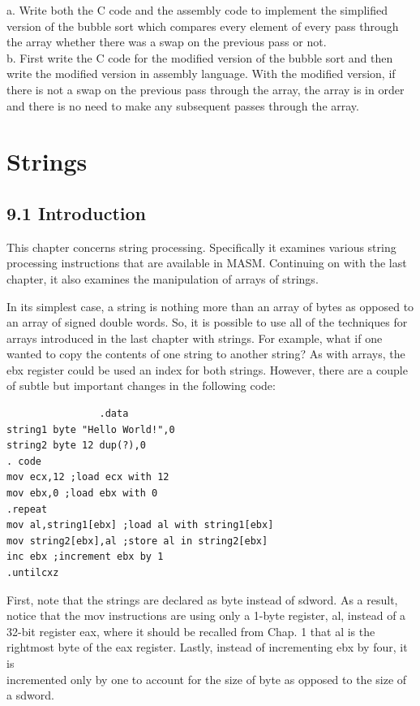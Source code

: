 \documentclass[10pt]{book}
\begin{document}
\begin{center}
\begin{center}
\begin{center}
a. Write both the C code and the assembly code to implement the simplified version of the bubble sort which compares every element of every pass through the array whether there was a swap on the previous pass or not.\\
b. First write the C code for the modified version of the bubble sort and then write the modified version in assembly language. With the modified version, if there is not a swap on the previous pass through the array, the array is in order and there is no need to make any subsequent passes through the array.

\section*{Strings}
\subsection*{9.1 Introduction}
This chapter concerns string processing. Specifically it examines various string processing instructions that are available in MASM. Continuing on with the last chapter, it also examines the manipulation of arrays of strings.

In its simplest case, a string is nothing more than an array of bytes as opposed to an array of signed double words. So, it is possible to use all of the techniques for arrays introduced in the last chapter with strings. For example, what if one wanted to copy the contents of one string to another string? As with arrays, the ebx register could be used an index for both strings. However, there are a couple of subtle but important changes in the following code:

\begin{verbatim}
                .data
string1 byte "Hello World!",0
string2 byte 12 dup(?),0
. code
mov ecx,12 ;load ecx with 12
mov ebx,0 ;load ebx with 0
.repeat
mov al,string1[ebx] ;load al with string1[ebx]
mov string2[ebx],al ;store al in string2[ebx]
inc ebx ;increment ebx by 1
.untilcxz
\end{verbatim}

First, note that the strings are declared as byte instead of sdword. As a result, notice that the mov instructions are using only a 1-byte register, al, instead of a 32-bit register eax, where it should be recalled from Chap. 1 that al is the rightmost byte of the eax register. Lastly, instead of incrementing ebx by four, it is\\
incremented only by one to account for the size of byte as opposed to the size of a sdword.


\end{center}
\end{center}
\end{center}
\end{document}
